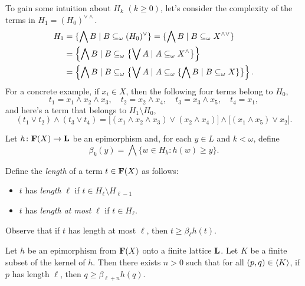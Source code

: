 To gain some intuition about $H_k$ $(k\geq 0)$, let's consider the complexity 
of the terms in $H_1 = (H_0)^{\vee \wedge}$. 
\begin{align*}
  H_1 &= \{\bigwedge B \mid B \subseteq_{\omega} (H_0)^{\vee}\}= \{\bigwedge B \mid B \subseteq_{\omega} X^{\wedge \vee}\}\\
      &= \left\{\bigwedge B \mid B \subseteq_{\omega} \bigl\{\bigvee A \mid A \subseteq_{\omega} X^\wedge \bigr\}\right\}\\
      &= \left\{\bigwedge B \mid B \subseteq_{\omega} \bigl\{\bigvee A \mid A \subseteq_{\omega} \{\bigwedge B \mid B \subseteq_{\omega} X\} \bigr\}\right\}.
\end{align*}
For a concrete example, if $x_i \in X$, then the following four
terms belong to $H_0$,
\[
t_1 = x_1 \wedge x_2 \wedge x_3, \quad t_2 = x_2 \wedge x_4, \quad t_3 = x_3 \wedge x_5, \quad t_4 = x_1,
\]
and here's a term that belongs to $H_1 \setminus H_0$,
\[
(t_1 \vee t_2) \wedge (t_3 \vee t_4) = \bigl[(x_1 \wedge x_2 \wedge x_3) \vee (x_2 \wedge x_4)\bigr] \wedge \bigl[(x_1 \wedge x_5)\vee x_2\bigr].
\]


Let $h \colon  \mathbf{F}(X) \to \mathbf{L}$ be an epimorphism and, 
for each $y \in L$ and $k< \omega$, define
\[
\beta_k(y) = \bigwedge \{w \in H_k : h(w) \geqslant y\}.
\]

Define the \emph{length} of a term $t \in \mathbf{F}(X)$ as follows:
\begin{itemize}
\item $t$ has \emph{length} $\ell$ if $t \in H_\ell \setminus H_{\ell-1}$
\item $t$ has \emph{length at most} $\ell$ if $t \in H_\ell$.
\end{itemize} 
Observe that if $t$ has length at most $\ell$, then $t\geq \beta_\ell h (t)$.

\begin{lemma}\label{lem:main}
Let $h$ be an epimorphism from $\mathbf{F}(X)$ onto a finite lattice $\mathbf{L}$.
Let $K$ be a finite subset of the kernel of $h$.
Then there exists $n>0$ such that for all $(p,q) \in \langle K\rangle$, if $p$ has length 
$\ell$, then $q \geq \beta_{\ell+n}h(q)$.
\end{lemma}


